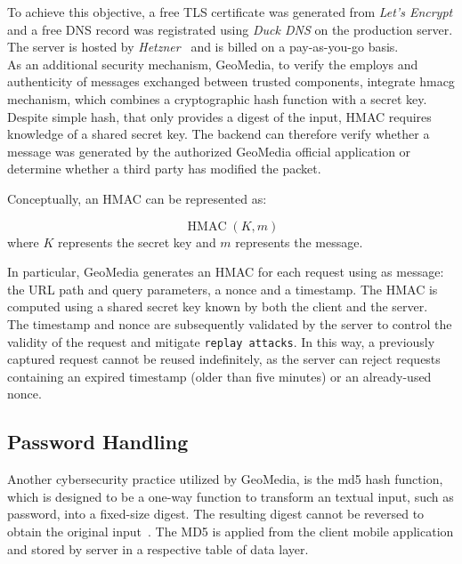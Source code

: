 
To achieve this objective, a free TLS certificate was generated from \textit{Let's Encrypt}\cite{site:lets-encrypt} and a free DNS record was registrated using \textit{Duck DNS}\cite{site-duckdns} on the production server. The server is hosted by \textit{Hetzner}~\cite{site-hetzner} and is billed on a pay-as-you-go basis.\\

As an additional security mechanism, GeoMedia, to verify the employs and authenticity of messages exchanged between trusted components, integrate \gls{hmacg} mechanism, which combines a cryptographic hash function with a secret key. Despite simple hash, that only provides a digest of the input, HMAC requires knowledge of a shared secret key. The backend can therefore verify whether a message was generated by the authorized GeoMedia official application or determine whether a third party has modified the packet. 

Conceptually, an HMAC can be represented as:

\[
\operatorname{HMAC}(K,m)
\]
where \(K\) represents the secret key and \(m\) represents the message.

In particular, GeoMedia generates an HMAC for each request using as message: the URL path and query parameters, a nonce and a timestamp. The HMAC is computed using a shared secret key known by both the client and the server.\\
The timestamp and nonce are subsequently validated by the server to control the validity of the request and mitigate \texttt{replay attacks}. In this way, a previously captured request cannot be reused indefinitely, as the server can reject requests containing an expired timestamp (older than five minutes) or an already-used nonce.

\subsection{Password Handling}

Another cybersecurity practice utilized by GeoMedia, is the \acrshort{md5} hash function, which is designed to be a one-way function to transform an textual input, such as password, into a fixed-size digest. The resulting digest cannot be reversed to obtain the original input~\cite{article:hash-md5}. The MD5 is applied from the client mobile application and stored by server in a respective table of data layer.




